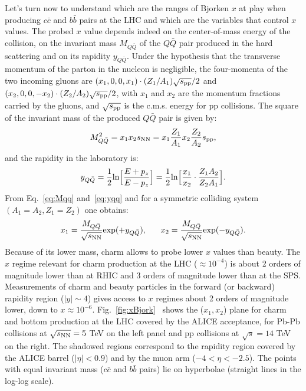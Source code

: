 Let's turn now to understand which are the ranges of Bjorken $x$
at play when producing $c\bar{c}$ and $b\bar{b}$ pairs at the LHC and which are the
variables that control $x$ values. The probed $x$ value depends indeed on the center-of-mass energy
of the collision, on the invariant mass $M_{Q\bar{Q}}$ of the $Q\bar{Q}$ pair produced in the hard scattering
and on its rapidity $y_{Q\bar{Q}}$. Under the hypothesis that the transverse momentum of the parton 
in the nucleon is negligible, the four-momenta of the two incoming gluons are $(x_1,0,0,x_1)\cdot(Z_1/A_1)\sqrt{s_{\rm pp}}/2$
and $(x_2,0,0,-x_2)\cdot(Z_2/A_2)\sqrt{s_{\rm pp}}/2$, with $x_1$ and $x_2$ are the momentum fractions 
carried by the gluons, and $\sqrt{s_{\rm pp}}$ is the c.m.s. energy for pp collisions. 
The square of the invariant mass of the produced $Q\bar{Q}$ pair is given by:
\begin{equation}
\label{eq:Mqq}
M_{Q\bar{Q}}^2 =  x_1 x_2 s_{\rm NN} = x_1 \frac{Z_1}{A_1} x_2 \frac{Z_2}{A_2} s_{\rm pp},
\end{equation}
and the rapidity in the laboratory is:
\begin{equation}
\label{eq:yqq}
y_{Q\bar{Q}} = \frac{1}{2} {\rm ln} {\Big [ } \frac{E +p_z}{E-p_z}  {\Big ] }= \frac{1}{2} {\rm ln} {\Big [ } \frac{x_1}{x_2} \cdot \frac{Z_1 A_2}{Z_2 A_1} {\Big ] }.    
\end{equation}
From Eq.~\ref{eq:Mqq} and~\ref{eq:yqq} and for a symmetric colliding system $(A_1 = A_2, Z_1 = Z_2)$
one obtains:
\begin{equation}
\label{eq:x1x2}
x_1 = \frac{M_{Q\bar{Q}}}{\sqrt{s_{\rm NN}}} {\rm exp} (+y_{Q\bar{Q}} ), \; \; \; \; \; \;
x_2 = \frac{M_{Q\bar{Q}}}{\sqrt{s_{\rm NN}}} {\rm exp} (-y_{Q\bar{Q}} ). 
\end{equation}
Because of its lower mass, charm allows to probe lower $x$ values than beauty. 
The $x$ regime relevant for charm production at the LHC ($\approx 10^{-4}$) is about 
2 orders of magnitude lower than at RHIC and 3 orders of magnitude lower than at the SPS.
Measurements of charm and beauty particles in the forward (or backward) rapidity region ($|y| \sim 4 $) 
gives access to $x$ regimes about 2 orders of magnitude lower, down to $x \approx 10^{-6}$.
Fig.~\ref{fig:xBjork}~\cite{Alessandro:2006yt} shows the ($x_1, x_2$) plane for charm and bottom production at the LHC
covered by the ALICE acceptance, for Pb-Pb
collisions at $\sqrt{s_{\rm NN}} = 5$ TeV on the left panel and pp collisions at $\sqrt{s} = 14$ TeV on the right.
The shadowed regions correspond to the rapidity region covered by the ALICE barrel ($|\eta| < 0.9$) and by the 
muon arm ($-4 < \eta < -2.5$).
The points with equal invariant mass ($c\bar{c}$ and $b\bar{b}$ pairs) lie on hyperbolae (straight lines in the log-log scale).\\


